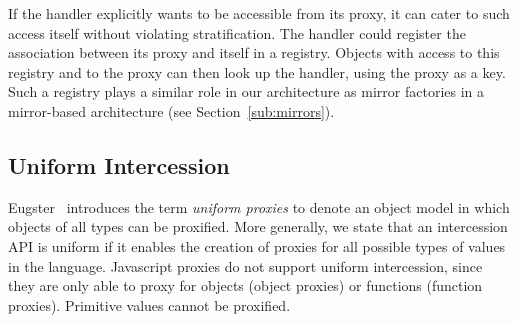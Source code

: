 \documentclass{sig-alternate}
\begin{document}
If the handler explicitly wants to be accessible from its proxy, it can cater to such access itself without violating stratification. The handler could register the association between its proxy and itself in a registry. Objects with access to this registry and to the proxy can then look up the handler, using the proxy as a key. Such a registry plays a similar role in our architecture as mirror factories in a mirror-based architecture (see Section~\ref{sub:mirrors}).





\subsection{Uniform Intercession}
\label{sub:uniform_intercession}

Eugster~\cite{eugster06uniform} introduces the term \emph{uniform proxies} to denote an object model in which objects of all types can be proxified. More generally, we state that an intercession API is uniform if it enables the creation of proxies for all possible types of values in the language. Javascript proxies do not support uniform intercession, since they are only able to proxy for objects (object proxies) or functions (function proxies). Primitive values cannot be proxified.
\end{document}
